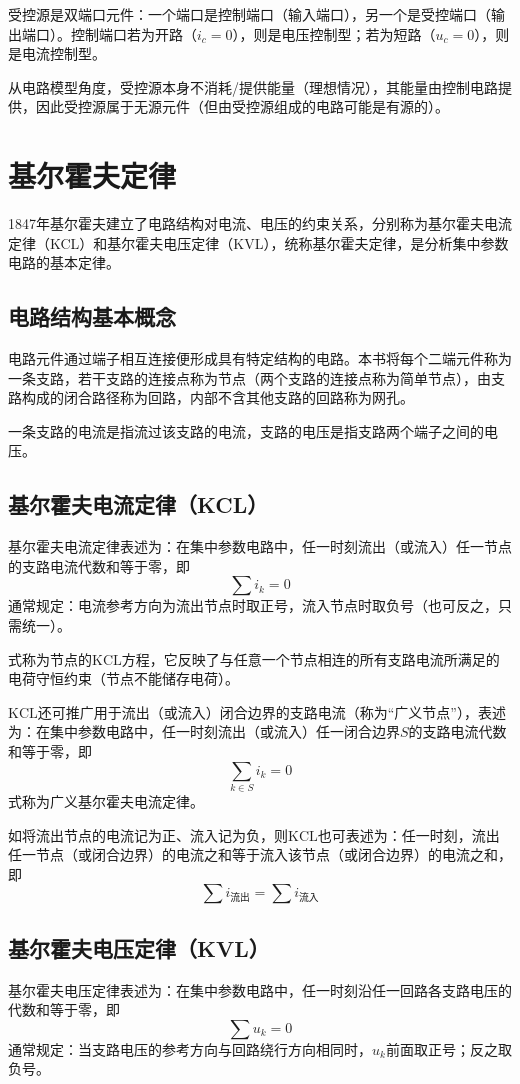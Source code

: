 受控源是双端口元件：一个端口是控制端口（输入端口），另一个是受控端口（输出端口）。控制端口若为开路（$i_c=0$），则是电压控制型；若为短路（$u_c=0$），则是电流控制型。

从电路模型角度，受控源本身不消耗/提供能量（理想情况），其能量由控制电路提供，因此受控源属于无源元件（但由受控源组成的电路可能是有源的）。

\section{基尔霍夫定律}
1847年基尔霍夫建立了电路结构对电流、电压的约束关系，分别称为基尔霍夫电流定律（KCL）和基尔霍夫电压定律（KVL），统称基尔霍夫定律，是分析集中参数电路的基本定律。

\subsection{电路结构基本概念}
电路元件通过端子相互连接便形成具有特定结构的电路。本书将每个二端元件称为一条支路，若干支路的连接点称为节点（两个支路的连接点称为简单节点），由支路构成的闭合路径称为回路，内部不含其他支路的回路称为网孔。

一条支路的电流是指流过该支路的电流，支路的电压是指支路两个端子之间的电压。

\subsection{基尔霍夫电流定律（KCL）}
基尔霍夫电流定律表述为：在集中参数电路中，任一时刻流出（或流入）任一节点的支路电流代数和等于零，即
\[
\sum i_k=0
\]
通常规定：电流参考方向为流出节点时取正号，流入节点时取负号（也可反之，只需统一）。

式称为节点的$\mathrm{KCL}$方程，它反映了与任意一个节点相连的所有支路电流所满足的电荷守恒约束（节点不能储存电荷）。

$\mathrm{KCL}$还可推广用于流出（或流入）闭合边界的支路电流（称为“广义节点”），表述为：在集中参数电路中，任一时刻流出（或流入）任一闭合边界$S$的支路电流代数和等于零，即
\[
\sum_{k\in S} i_k=0
\]
式称为广义基尔霍夫电流定律。

如将流出节点的电流记为正、流入记为负，则$\mathrm{KCL}$也可表述为：任一时刻，流出任一节点（或闭合边界）的电流之和等于流入该节点（或闭合边界）的电流之和，即
\[
\sum i_{\text{流出}}=\sum i_{\text{流入}}
\]

\subsection{基尔霍夫电压定律（KVL）}
基尔霍夫电压定律表述为：在集中参数电路中，任一时刻沿任一回路各支路电压的代数和等于零，即
\[
\sum u_k=0
\]
通常规定：当支路电压的参考方向与回路绕行方向相同时，$u_k$前面取正号；反之取负号。

